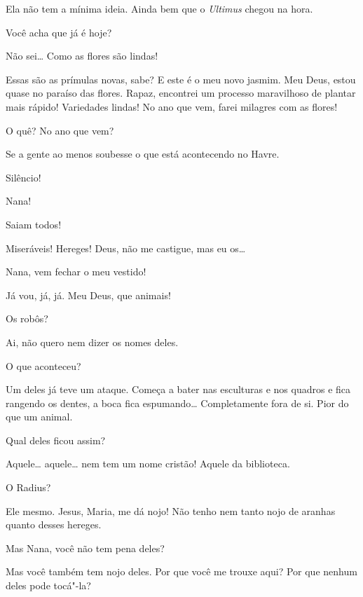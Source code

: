  Ela não tem a mínima ideia.  Ainda bem que o
\textit{Ultimus} chegou na hora.

  Você acha que já é hoje?

 Não sei\ldots{} Como as flores são lindas!

  Essas são as prímulas novas, sabe? E este é o
meu novo jasmim. Meu Deus, estou quase no paraíso das flores. Rapaz, encontrei
um processo maravilhoso de plantar mais rápido! Variedades lindas! No ano que
vem, farei milagres com as flores!

  O quê? No ano que vem?

 Se a gente ao menos soubesse o que está acontecendo no Havre.

 Silêncio!

  Nana!

 Saiam todos! 

  Miseráveis! Hereges! Deus, não me
castigue, mas eu os\ldots{}

  Nana, vem fechar o meu vestido!

 Já vou, já, já.  Meu Deus, que animais!

 Os robôs?

 Ai, não quero nem dizer os nomes deles.

 O que aconteceu?

 Um deles já teve um ataque. Começa a bater nas esculturas e nos quadros e
fica rangendo os dentes, a boca fica espumando\ldots{} Completamente fora de si.
Pior do que um animal.

 Qual deles ficou assim?

 Aquele\ldots{} aquele\ldots{} nem tem um nome cristão! Aquele da biblioteca.

 O Radius?

 Ele mesmo. Jesus, Maria, me dá nojo! Não tenho nem tanto nojo de aranhas
quanto desses hereges.

 Mas Nana, você não tem pena deles?

 Mas você também tem nojo deles. Por que você me trouxe aqui? Por que
nenhum deles pode tocá"-la?

